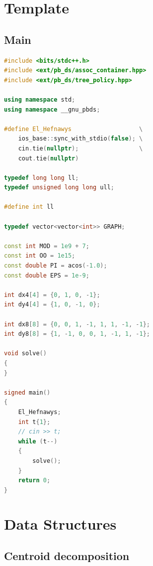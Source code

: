 \documentclass[10pt,landscape,a4paper,twocolumn]{article}
\begin{document}
\tableofcontents
\newpage
\section{Template}
\subsection{Main}
\begin{lstlisting}[language=C++]
#include <bits/stdc++.h>
#include <ext/pb_ds/assoc_container.hpp>
#include <ext/pb_ds/tree_policy.hpp>

using namespace std;
using namespace __gnu_pbds;

#define El_Hefnawys                   \
    ios_base::sync_with_stdio(false); \
    cin.tie(nullptr);                 \
    cout.tie(nullptr)

typedef long long ll;
typedef unsigned long long ull;

#define int ll

typedef vector<vector<int>> GRAPH;

const int MOD = 1e9 + 7;
const int OO = 1e15;
const double PI = acos(-1.0);
const double EPS = 1e-9;

int dx4[4] = {0, 1, 0, -1};
int dy4[4] = {1, 0, -1, 0};

int dx8[8] = {0, 0, 1, -1, 1, 1, -1, -1};
int dy8[8] = {1, -1, 0, 0, 1, -1, 1, -1};

void solve()
{
}

signed main()
{
    El_Hefnawys;
    int t{1};
    // cin >> t;
    while (t--)
    {
        solve();
    }
    return 0;
}

\end{lstlisting}
\section{Data Structures}
\subsection{Centroid decomposition}
\end{document}
